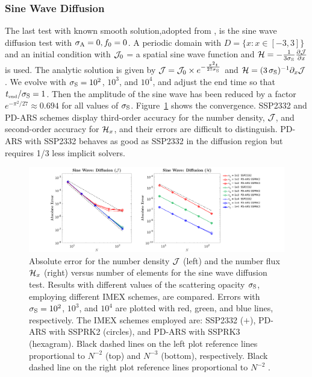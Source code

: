 \subsubsection{Sine Wave Diffusion}
The last test with known smooth solution,adopted from \cite{radice_etal_2013}, is the sine wave diffusion test with $\sigma_{{\rm A}} = 0, f_0 = 0$.
A periodic domain with $D=\{x:x\in[-3,3]\}$ and an initial condition with $\mathcal{J}_{0}$ = a spatial sine wave function and $\mathcal{H} =-\frac{1}{3\sigma_{{\rm S}}}\frac{\partial \mathcal{J}}{\partial x}$ is used.
The analytic solution is given by $\mathcal{J} = \mathcal{J}_{0} \times e^{-\frac{\pi^2 t}{27\sigma_{{\rm S}}}}$ and $\mathcal{H} = (3\,\sigma_{{\rm S}})^{-1}\partial_{x}{\mathcal{J}}$.
We evolve with $\sigma_{{\rm S}}=10^{2}$, $10^{3}$, and $10^{4}$, and adjust the end time so that $t_{\mbox{\tiny end}}/\sigma_{{\rm S}}=1$. 
Then the amplitude of the sine wave has been reduced by a factor $e^{-\pi^{2}/27}\approx0.694$ for all values of $\sigma_{{\rm S}}$. 
Figure~\ref{fig:SineWaveDiffusionJ} shows the convergence.
SSP2332 and PD-ARS schemes display third-order accuracy for the number density, $\mathcal{J}$, and second-order accuracy for $\mathcal{H}_{x}$, and their errors are difficult to distinguish.
PD-ARS with SSP2332 behaves as good as SSP2332 in the diffusion region but requires 1/3 less implicit solvers.
\begin{figure}[h]
  \centering
  \centerline{\includegraphics[width=1.2\textwidth]{figures/SineWaveDiffusion}}
   \caption{Absolute error for the number density $\mathcal{J}$ (left) and the number flux $\mathcal{H}_{x}$ (right) versus number of elements for the sine wave diffusion test.  Results with different values of the scattering opacity $\sigma_{{\rm S}}$, employing different IMEX schemes, are compared.  Errors with $\sigma_{{\rm S}}=10^{2}$, $10^{3}$, and $10^{4}$ are plotted with red, green, and blue lines, respectively.  The IMEX schemes employed are:  SSP2332 ($+$), PD-ARS with SSPRK2 (circles), and PD-ARS with SSPRK3 (hexagram). Black dashed lines on the left plot reference lines proportional to $N^{-2}$ (top) and $N^{-3}$ (bottom), respectively. Black dashed line on the right plot reference lines proportional to $N^{-2}$ .}
   \label{fig:SineWaveDiffusionJ}
\end{figure}

